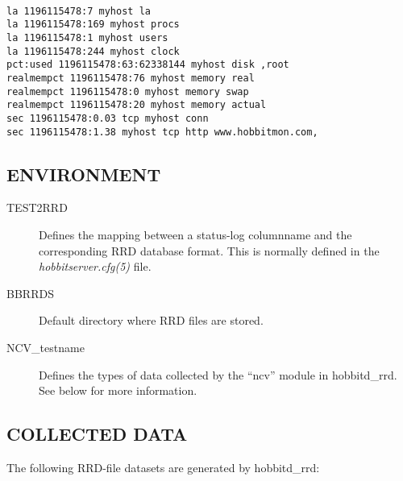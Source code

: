 \begin{description}
 \begin{verbatim}

la 1196115478:7 myhost la
la 1196115478:169 myhost procs
la 1196115478:1 myhost users
la 1196115478:244 myhost clock
pct:used 1196115478:63:62338144 myhost disk ,root
realmempct 1196115478:76 myhost memory real
realmempct 1196115478:0 myhost memory swap
realmempct 1196115478:20 myhost memory actual
sec 1196115478:0.03 tcp myhost conn
sec 1196115478:1.38 myhost tcp http www.hobbitmon.com,

\end{verbatim}



 


 


 


\end{description}
\subsection{ENVIRONMENT}
\begin{description}
\item[TEST2RRD] Defines the mapping between a status-log columnname and the corresponding RRD database format. This is normally defined in the \emph{hobbitserver.cfg(5)}
 file. 

 

\item[BBRRDS] Default directory where RRD files are stored. 

 

\item[NCV\_testname] Defines the types of data collected by the ``ncv'' module in hobbitd\_rrd. See below for more information. 

 


\end{description}
\subsection{COLLECTED DATA}
 The following RRD-file datasets are generated by hobbitd\_rrd: 

